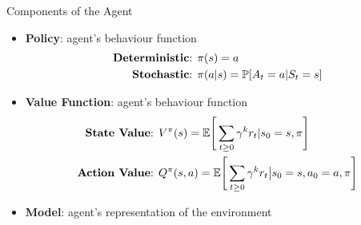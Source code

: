 \documentclass[aspectratio=169,handout]{beamer}
\begin{document}

\begin{frame}{Components of the Agent}
	\begin{itemize}
		\item{\textbf{Policy}:  agent’s behaviour function}
		\begin{equation*}
			\begin{aligned}
			\text{\textbf{Deterministic}: }& \pi(s) = a \\
			\text{\textbf{Stochastic}: }& \pi(a|s) = \mathbb{P}[A_t = a | S_t = s]
			\end{aligned}
		\end{equation*}
		\item{\textbf{Value Function}:  agent’s behaviour function}
				\begin{equation*}
				\begin{aligned}
				\text{\textbf{State Value}: }& V^\pi(s) = \mathbb{E} \Bigg[\sum_{t \ge 0} \gamma^k r_t|s_0 = s, \pi\Bigg]\\
				\text{\textbf{Action Value}: }& Q^\pi(s,a) = \mathbb{E} \Bigg[\sum_{t \ge 0} \gamma^k r_t \big| s_0 = s, a_0 = a, \pi\Bigg]\\
				\end{aligned}
				\end{equation*}
		\item{\textbf{Model}:  agent’s representation of the environment}
	\end{itemize}
	
\end{frame}
\end{document}

